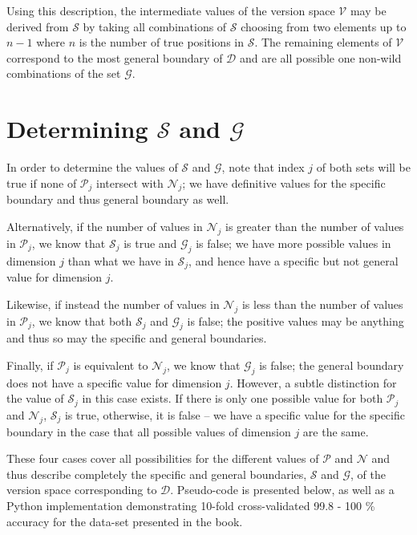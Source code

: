 Using this description, the intermediate values of the version space $\mathcal{V}$ may be derived from $\mathcal{S}$ by taking all combinations of $\mathcal{S}$ choosing from two elements up to $n-1$ where $n$ is the number of true positions in $\mathcal{S}$.  The remaining elements of $\mathcal{V}$ correspond to the most general boundary of $\mathcal{D}$ and are all possible one non-wild combinations of the set $\mathcal{G}$.

\section*{Determining $\mathcal{S}$ and $\mathcal{G}$}

In order to determine the values of $\mathcal{S}$ and $\mathcal{G}$, note that index $j$ of both sets will be true if none of $\mathcal{P}_j$ intersect with $\mathcal{N}_j$; we have definitive values for the specific boundary and thus general boundary as well.  

Alternatively, if the number of values in $\mathcal{N}_j$ is greater than the number of values in $\mathcal{P}_j$, we know that $\mathcal{S}_j$ is true and $\mathcal{G}_j$ is false; we have more possible values in dimension $j$ than what we have in $\mathcal{S}_j$, and hence have a specific but not general value for dimension $j$.  

Likewise, if instead the number of values in $\mathcal{N}_j$ is less than the number of values in $\mathcal{P}_j$, we know that both $\mathcal{S}_j$ and $\mathcal{G}_j$ is false; the positive values may be anything and thus so may the specific and general boundaries.  

Finally, if $\mathcal{P}_j$ is equivalent to $\mathcal{N}_j$, we know that $\mathcal{G}_j$ is false; the general boundary does not have a specific value for dimension $j$.  However, a subtle distinction for the value of $\mathcal{S}_j$ in this case exists.  If there is only one possible value for both $\mathcal{P}_j$ and $\mathcal{N}_j$, $\mathcal{S}_j$ is true, otherwise, it is false -- we have a specific value for the specific boundary in the case that all possible values of dimension $j$ are the same.

These four cases cover all possibilities for the different values of $\mathcal{P}$ and $\mathcal{N}$ and thus describe completely the specific and general boundaries, $\mathcal{S}$ and $\mathcal{G}$, of the version space corresponding to $\mathcal{D}$.  Pseudo-code is presented below, as well as a Python implementation demonstrating 10-fold cross-validated 99.8 - 100 \% accuracy for the data-set presented in the book.

